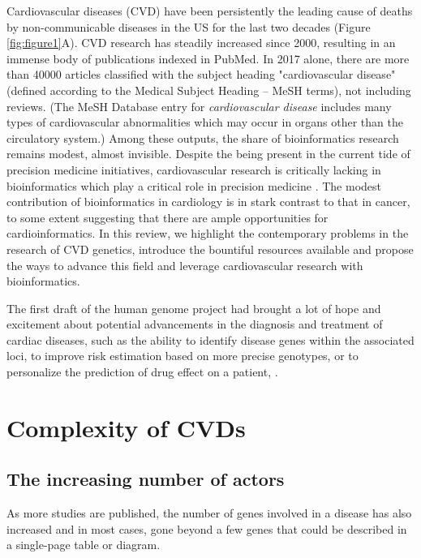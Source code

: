 \documentclass[letter]{bioinfo}
\begin{document}
Cardiovascular diseases (CVD) have been persistently the leading cause of deaths by non-communicable diseases in the US for the last two decades (Figure \ref{fig:figure1}A). CVD research has steadily increased since 2000, resulting in an immense body of publications indexed in PubMed. In 2017 alone, there are more than 40000 articles classified with the subject heading "cardiovascular disease" (defined according to the Medical Subject Heading -- MeSH terms), not including reviews. (The MeSH Database entry for \textit{cardiovascular disease} includes many types of cardiovascular abnormalities which may occur in organs other than the circulatory system.) Among these outputs, the share of bioinformatics research remains modest, almost invisible. Despite the being present in the current tide of precision medicine initiatives, cardiovascular research is critically lacking in bioinformatics which play a critical role in precision medicine \citep{Gomez-Lopez:2017:Precision}.  The modest contribution of bioinformatics in cardiology is in stark contrast to that in cancer, to some extent suggesting that there are ample opportunities for cardioinformatics. In this review, we highlight the contemporary problems in the research of CVD genetics, introduce the bountiful resources available and propose the ways to advance this field and leverage cardiovascular research with bioinformatics.

The first draft of the human genome project had brought a lot of hope and excitement about potential advancements in the diagnosis and treatment of cardiac diseases, such as the ability to identify disease genes within the associated loci, to improve risk estimation based on more precise genotypes, or to personalize the prediction of drug effect on a patient, \citep{Komajda:2001:heart}.



\section{Complexity of CVDs}

\subsection{The increasing number of actors}

As more studies are published, the number of genes involved in a disease has also increased and in most cases, gone beyond a few genes that could be described in a single-page table or diagram.
\end{document}
